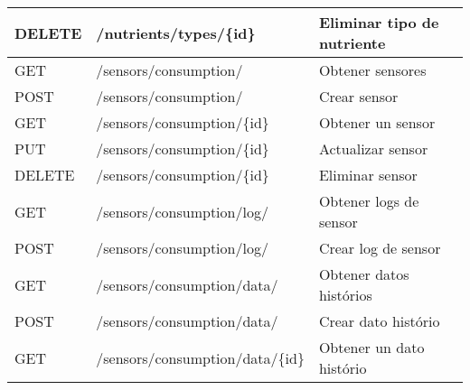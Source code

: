 \begin{table}[H]
\begin{tabular}{l l l}
        DELETE          & /nutrients/types/\{id\}          & Eliminar tipo de nutriente   \\
        \midrule
        GET             & /sensors/consumption/            & Obtener sensores             \\
        POST            & /sensors/consumption/            & Crear sensor                 \\
        GET             & /sensors/consumption/\{id\}      & Obtener un sensor            \\
        PUT             & /sensors/consumption/\{id\}      & Actualizar sensor            \\
        DELETE          & /sensors/consumption/\{id\}      & Eliminar sensor              \\
        \midrule
        GET             & /sensors/consumption/log/        & Obtener logs de sensor       \\
        POST            & /sensors/consumption/log/        & Crear log de sensor          \\
        \midrule
        GET             & /sensors/consumption/data/       & Obtener datos histórios      \\
        POST            & /sensors/consumption/data/       & Crear dato histório          \\
        GET             & /sensors/consumption/data/\{id\} & Obtener un dato histório     \\
        \bottomrule
        \hline
    \end{tabular}
    \label{tab:endpoints2}
\end{table}

